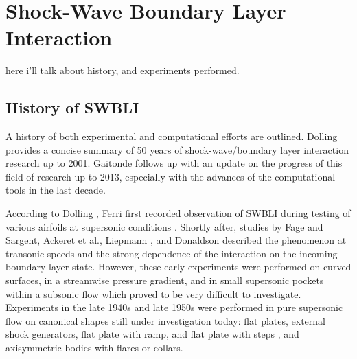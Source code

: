 \section{Shock-Wave Boundary Layer Interaction}

here i'll talk about history, and experiments performed.




\subsection{History of SWBLI}

A history of both experimental and computational efforts are outlined. Dolling \cite{Dolling2001} provides a concise summary of 50 years of shock-wave/boundary layer interaction research up to 2001. Gaitonde \cite{Gaitonde2013} follows up with an update on the progress of this field of research up to 2013, especially with the advances of the computational tools in the last decade.

According to Dolling \cite{Dolling2001}, Ferri first recorded observation of SWBLI during testing of various airfoils at supersonic conditions \cite{Ferri1938, Ferri1940}. Shortly after, studies by Fage and Sargent, Ackeret et al., Liepmann \cite{Liepmann1946}, and Donaldson described the phenomenon at transonic speeds and the strong dependence of the interaction on the incoming boundary layer state. However, these early experiments were performed on curved surfaces, in a streamwise pressure gradient, and in small supersonic pockets within a subsonic flow which proved to be very difficult to investigate. Experiments in the late 1940s and late 1950s were performed in pure supersonic flow on canonical shapes still under investigation today: flat plates, external shock generators, flat plate with ramp, and flat plate with steps \cite{Beastall1950}, and axisymmetric bodies with flares or collars. 

